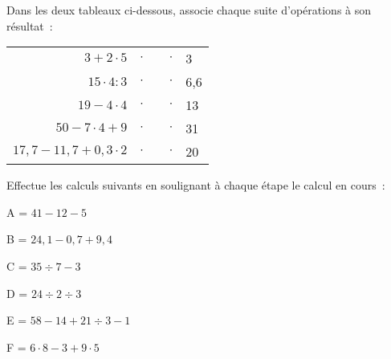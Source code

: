 

\begin{exercice}
Dans les deux tableaux ci-dessous, associe chaque suite d'opérations à son résultat :
\begin{center}
 \begin{tabularx}{\linewidth}{|r|lXr|l|}
  \cline{1-1}\cline{5-5}
  $3 + 2 \cdot 5$ & $\cdot$ & & $\cdot$ & 3 \\  \cline{1-1}\cline{5-5}
  $15 \cdot 4 : 3$ & $\cdot$ & & $\cdot$ & 6,6 \\ \cline{1-1}\cline{5-5}
  $19 - 4 \cdot 4$ & $\cdot$ & & $\cdot$ & 13 \\ \cline{1-1}\cline{5-5}
  $50 - 7 \cdot 4 + 9$ & $\cdot$ & & $\cdot$ & 31 \\ \cline{1-1}\cline{5-5}
  $17,7 - 11,7 + 0,3 \cdot 2$ & $\cdot$ & & $\cdot$ & 20 \\ \cline{1-1}\cline{5-5}
  \end{tabularx}
\end{center}

\end{exercice}


\begin{exercice}
Effectue les calculs suivants en soulignant à chaque étape le calcul en cours :
 \begin{colitemize}{2}
 \item A = $41 - 12 - 5$
 
 \dotfill
 
 \dotfill

 \item  B = $24,1 - 0,7 + 9,4$
 
 \dotfill

 \dotfill
 
 \item C = $35 \div 7 - 3$
 
 \dotfill

 \dotfill
 
 \item D = $24 \div 2 \div 3$
 
 \dotfill

 \dotfill
 
 \item E = {\small$58 - 14 + 21 \div 3 - 1$}
 
 \dotfill

 \dotfill
 
 \dotfill

 \dotfill

 \item F = $6 \cdot 8 - 3 + 9 \cdot 5$
 
 \dotfill

 \dotfill

 \dotfill

 \dotfill
 \end{colitemize}
\end{exercice}


